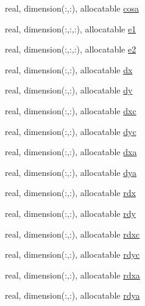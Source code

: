 \begin{DoxyCompactItemize}
\item 
real, dimension(\-:,\-:), allocatable \hyperlink{structfv__arrays__mod_1_1fv__grid__type_aa4800a8e89eb3a1a685998dba6b80edc}{cosa}
\item 
real, dimension(\-:,\-:,\-:), allocatable \hyperlink{structfv__arrays__mod_1_1fv__grid__type_a60093b96a91fd6682fe9d3a13f7e33f6}{e1}
\item 
real, dimension(\-:,\-:,\-:), allocatable \hyperlink{structfv__arrays__mod_1_1fv__grid__type_a5304234fe48437b157b8d6a0796fb4e7}{e2}
\item 
real, dimension(\-:,\-:), allocatable \hyperlink{structfv__arrays__mod_1_1fv__grid__type_a5355993251b97f7e585682eed90cf816}{dx}
\item 
real, dimension(\-:,\-:), allocatable \hyperlink{structfv__arrays__mod_1_1fv__grid__type_a2533f9a11ec2e1180249e7e2e3dd3048}{dy}
\item 
real, dimension(\-:,\-:), allocatable \hyperlink{structfv__arrays__mod_1_1fv__grid__type_a7a4d21a6fe383c9dea04c5c739a3725f}{dxc}
\item 
real, dimension(\-:,\-:), allocatable \hyperlink{structfv__arrays__mod_1_1fv__grid__type_ab94e6fe03dec09dba3538b40f011ba71}{dyc}
\item 
real, dimension(\-:,\-:), allocatable \hyperlink{structfv__arrays__mod_1_1fv__grid__type_aa787cdeab136f88928f2a74d9540b605}{dxa}
\item 
real, dimension(\-:,\-:), allocatable \hyperlink{structfv__arrays__mod_1_1fv__grid__type_a1a3a6cd57e4d32de4e396949df7d47db}{dya}
\item 
real, dimension(\-:,\-:), allocatable \hyperlink{structfv__arrays__mod_1_1fv__grid__type_ad7c917dbdf173e2849f68fb711de725e}{rdx}
\item 
real, dimension(\-:,\-:), allocatable \hyperlink{structfv__arrays__mod_1_1fv__grid__type_a3634b07481a0ee2a9e4873bd266e2186}{rdy}
\item 
real, dimension(\-:,\-:), allocatable \hyperlink{structfv__arrays__mod_1_1fv__grid__type_a96991b006ee53d3efe6b2e0334ef1011}{rdxc}
\item 
real, dimension(\-:,\-:), allocatable \hyperlink{structfv__arrays__mod_1_1fv__grid__type_ad17eb4f3ce260eac07d6266117758b04}{rdyc}
\item 
real, dimension(\-:,\-:), allocatable \hyperlink{structfv__arrays__mod_1_1fv__grid__type_a80c3f1535ed4d68548891a0c36104b87}{rdxa}
\item 
real, dimension(\-:,\-:), allocatable \hyperlink{structfv__arrays__mod_1_1fv__grid__type_a4fba9fe1697d1c49fc8bc3b636c7970a}{rdya}

\end{DoxyCompactItemize}
